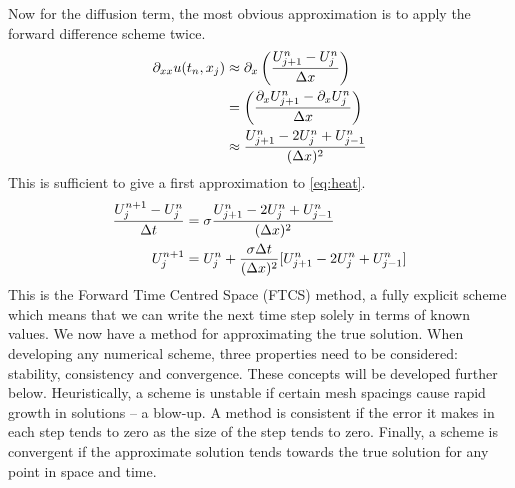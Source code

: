 Now for the diffusion term, the most obvious approximation is to apply the forward difference scheme twice.
\begin{align*}
\partial_{xx} u(t_n,x_j) &\approx \partial_x \left(\frac{U^n_{j+1}- U^n_j}{\Delta x}\right)\\
&=  \left(\frac{\partial_x U^n_{j+1} - \partial_x U^n_j}{\Delta x}\right)\\
&\approx \frac{U^n_{j+1} - 2U^n_{j} + U^n_{j-1}}{(\Delta x)^2}
\end{align*}
This is sufficient to give a first approximation to \eqref{eq:heat}.
\begin{align}\label{eq:FTCSheat}
\frac{U^{n+1}_j- U^n_j}{\Delta t} &= \sigma \frac{U^n_{j+1} - 2U^n_{j} + U^n_{j-1}}{(\Delta x)^2}\\
U^{n+1}_j &= U^n_j +  \frac{\sigma\Delta t}{(\Delta x)^2}\lbrack U^n_{j+1} - 2U^n_{j} + U^n_{j-1}\rbrack 
\end{align}
This is the Forward Time Centred Space (FTCS) method, a fully explicit scheme which means that we can write the next time step solely in terms of known values. We now have a method for approximating the true solution. When developing any numerical scheme, three properties need to be considered: stability, consistency and convergence. These concepts will be developed further below. Heuristically, a scheme is unstable if certain mesh spacings cause rapid growth in solutions -- a blow-up. A method is consistent if the error it makes in each step tends to zero as the size of the step tends to zero. Finally, a scheme is convergent if the approximate solution tends towards the true solution for any point in space and time. 

